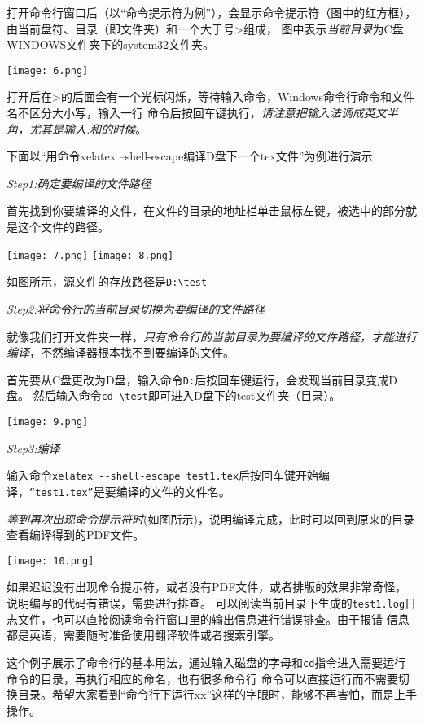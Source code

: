 打开命令行窗口后（以“命令提示符为例”），会显示命令提示符（图中的红方框），由当前盘符、目录（即文件夹）和一个大于号>组成，
图中表示\emph{当前目录}为C盘WINDOWS文件夹下的system32文件夹。
\begin{center}
  \texttt{[image: 6.png]}
\end{center}
打开后在>的后面会有一个光标闪烁，等待输入命令，Windows命令行命令和文件名不区分大小写，输入一行
命令后按回车键执行，\emph{请注意把输入法调成英文半角，尤其是输入:和\texttt{}的时候}。

下面以“用命令xelatex --shell-escape编译D盘下一个tex文件”为例进行演示

\emph{Step1:确定要编译的文件路径}

  首先找到你要编译的文件，在文件的目录的地址栏单击鼠标左键，被选中的部分就是这个文件的路径。
\begin{center}
  \texttt{[image: 7.png]}
  \texttt{[image: 8.png]}
\end{center}
如图所示，源文件的存放路径是\verb"D:\test"

\emph{Step2:将命令行的当前目录切换为要编译的文件路径}

就像我们打开文件夹一样，\emph{只有命令行的当前目录为要编译的文件路径，才能进行编译}，不然编译器根本找不到要编译的文件。

首先要从C盘更改为D盘，输入命令\verb"D:"后按回车键运行，会发现当前目录变成D盘。
然后输入命令\verb"cd \test"即可进入D盘下的test文件夹（目录）。
\begin{center}
  \texttt{[image: 9.png]}
\end{center}

\emph{Step3:编译}

输入命令\verb"xelatex --shell-escape test1.tex"后按回车键开始编译，\verb"“test1.tex”"是要编译的文件的文件名。

\emph{等到再次出现命令提示符时}(如图所示)，说明编译完成，此时可以回到原来的目录查看编译得到的PDF文件。
\begin{center}
  \texttt{[image: 10.png]}
\end{center}

如果迟迟没有出现命令提示符，或者没有PDF文件，或者排版的效果非常奇怪，说明编写的代码有错误，需要进行排查。
可以阅读当前目录下生成的\verb"test1.log"日志文件，也可以直接阅读命令行窗口里的输出信息进行错误排查。由于报错
信息都是英语，需要随时准备使用翻译软件或者搜索引擎。

这个例子展示了命令行的基本用法，通过输入磁盘的字母和\verb"cd"指令进入需要运行命令的目录，再执行相应的命名，也有很多命令行
命令可以直接运行而不需要切换目录。希望大家看到“命令行下运行xx”这样的字眼时，能够不再害怕，而是上手操作。




